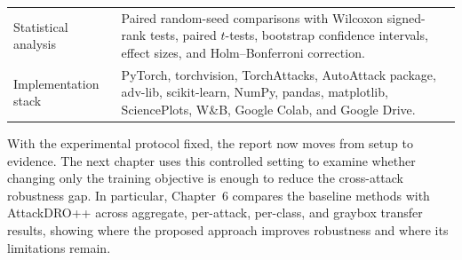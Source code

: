 \begin{table}[H]
\begin{tabularx}{\textwidth}{@{}
>{\raggedright\arraybackslash}p{}
>{\raggedright\arraybackslash}X
@{}}
Statistical analysis
& Paired random-seed comparisons with Wilcoxon signed-rank tests, paired $t$-tests, bootstrap confidence intervals, effect sizes, and Holm--Bonferroni correction. \\

Implementation stack
& PyTorch, torchvision, TorchAttacks, AutoAttack package, adv-lib, scikit-learn, NumPy, pandas, matplotlib, SciencePlots, W\&B, Google Colab, and Google Drive. \\

\bottomrule
\end{tabularx}
\end{table}

With the experimental protocol fixed, the report now moves from setup to evidence.
The next chapter uses this controlled setting to examine whether changing only the
training objective is enough to reduce the cross-attack robustness gap. In particular,
Chapter~6 compares the baseline methods with AttackDRO++ across aggregate,
per-attack, per-class, and graybox transfer results, showing where the proposed
approach improves robustness and where its limitations remain.
